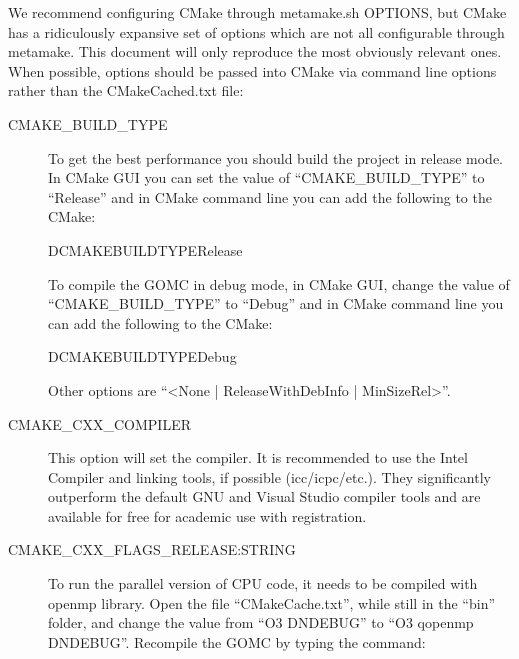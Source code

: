 \documentclass[letterpaper,10pt,english]{sphinxmanual}
\begin{document}
\sphinxAtStartPar
We recommend configuring CMake through metamake.sh OPTIONS, but CMake has a ridiculously expansive set of options which are not all configurable through metamake.  This document will only reproduce the most obviously relevant ones.  When possible, options should be passed into CMake via command line options rather than the CMakeCached.txt file:
\begin{description}
\item[{CMAKE\_BUILD\_TYPE}] \leavevmode
\sphinxAtStartPar
To get the best performance you should build the project in release mode. In CMake GUI you can set the value of “CMAKE\_BUILD\_TYPE” to “Release” and in CMake command line you can add the following to the CMake:

\begin{sphinxVerbatim}[commandchars=\\\{\}]
\PYGZhy{}DCMAKE\PYGZus{}BUILD\PYGZus{}TYPERelease
\end{sphinxVerbatim}

\sphinxAtStartPar
To compile the GOMC in debug mode, in CMake GUI, change the value of “CMAKE\_BUILD\_TYPE” to “Debug” and in CMake command line you can add the following to the CMake:

\begin{sphinxVerbatim}[commandchars=\\\{\}]
\PYGZhy{}DCMAKE\PYGZus{}BUILD\PYGZus{}TYPEDebug
\end{sphinxVerbatim}

\sphinxAtStartPar
Other options are “\textless{}None | ReleaseWithDebInfo | MinSizeRel\textgreater{}”.

\item[{CMAKE\_CXX\_COMPILER}] \leavevmode
\sphinxAtStartPar
This option will set the compiler. It is recommended to use the Intel Compiler and linking tools, if possible (icc/icpc/etc.). They significantly outperform the default GNU and Visual Studio compiler tools and are available for free for academic use with registration.

\item[{CMAKE\_CXX\_FLAGS\_RELEASE:STRING}] \leavevmode
\sphinxAtStartPar
To run the parallel version of CPU code, it needs to be compiled with openmp library. Open the file “CMakeCache.txt”, while still in the “bin” folder, and change the value from “\sphinxhyphen{}O3 \sphinxhyphen{}DNDEBUG” to “\sphinxhyphen{}O3 \sphinxhyphen{}qopenmp \sphinxhyphen{}DNDEBUG”. Recompile the GOMC by typing the command:


\end{description}
\end{document}
